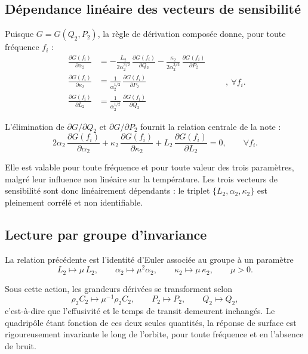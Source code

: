 \documentclass[11pt,a4paper]{article}
\begin{document}
\subsection{Dépendance linéaire des vecteurs de sensibilité}

Puisque $G=G(Q_{2},P_{2})$, la règle de dérivation composée donne, pour toute fréquence $f_{i}$ :
\[
\begin{aligned}
\frac{\partial G(f_{i})}{\partial\alpha_{2}}
&= -\frac{L_{2}}{2\alpha_{2}^{3/2}}\,\frac{\partial G(f_{i})}{\partial Q_{2}}
   -\frac{\kappa_{2}}{2\alpha_{2}^{3/2}}\,\frac{\partial G(f_{i})}{\partial P_{2}} \\[2pt]
\frac{\partial G(f_{i})}{\partial\kappa_{2}}
&= \frac{1}{\alpha_{2}^{1/2}}\,\frac{\partial G(f_{i})}{\partial P_{2}} \\[2pt]
\frac{\partial G(f_{i})}{\partial L_{2}}
&= \frac{1}{\alpha_{2}^{1/2}}\,\frac{\partial G(f_{i})}{\partial Q_{2}}
\end{aligned}
\qquad ,\ \forall f_{i} .
\]

L'élimination de $\partial G/\partial Q_{2}$ et $\partial G/\partial P_{2}$ fournit la relation centrale
de la note :
\[ 2\alpha_{2}\,\frac{\partial G(f_{i})}{\partial\alpha_{2}}
+ \kappa_{2}\,\frac{\partial G(f_{i})}{\partial\kappa_{2}}
+ L_{2}\,\frac{\partial G(f_{i})}{\partial L_{2}} = 0 ,
\qquad \forall f_{i} . \]

Elle est valable pour toute fréquence et pour toute valeur des trois paramètres, malgré leur influence
non linéaire sur la température. Les trois vecteurs de sensibilité sont donc linéairement dépendants :
le triplet $\{L_{2},\alpha_{2},\kappa_{2}\}$ est pleinement corrélé et non identifiable.

\subsection{Lecture par groupe d'invariance}

La relation précédente est l'identité d'Euler associée au groupe à un paramètre
\[ L_{2}\mapsto\mu\,L_{2} , \qquad \alpha_{2}\mapsto\mu^{2}\alpha_{2} ,
\qquad \kappa_{2}\mapsto\mu\,\kappa_{2} , \qquad \mu>0 . \]

Sous cette action, les grandeurs dérivées se transforment selon
\[ \rho_{2}C_{2}\mapsto\mu^{-1}\rho_{2}C_{2} , \qquad P_{2}\mapsto P_{2} ,
\qquad Q_{2}\mapsto Q_{2} , \]
c'est-à-dire que l'effusivité et le temps de transit demeurent inchangés. Le quadripôle étant fonction
de ces deux seules quantités, la réponse de surface est rigoureusement invariante le long de l'orbite,
pour toute fréquence et en l'absence de bruit.
\end{document}
